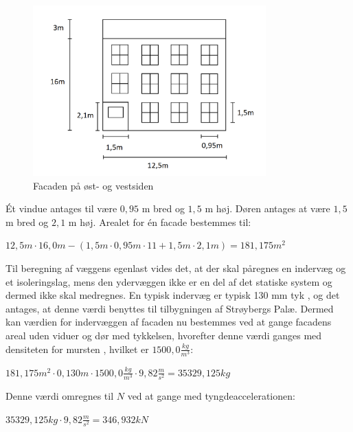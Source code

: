 \begin{figure}[htbp]
	\centering
	\includegraphics[width=0.8\textwidth]{billeder/facadenord.png}
	\caption{Facaden på øst- og vestsiden}
	\label{fig:facade}
\end{figure}

\indent{     }  Ét vindue antages til være $0,\!95$ m bred og $1,\!5$ m høj. Døren antages at være $1,\!5$ m bred og $2,\!1$ m høj. Arealet for én facade bestemmes til:
\begin{center}
	$12,\!5 m\cdot 16,\!0 m - (1,\!5 m\cdot0,\!95 m\cdot11 + 1,\!5 m\cdot 2,\!1 m)=181,\!175 m^2$
\end{center}

Til beregning af væggens egenlast vides det, at der skal påregnes en indervæg og et isoleringslag, mens den ydervæggen ikke er en del af det statiske system og dermed ikke skal medregnes.
\newline \indent{     }  En typisk indervæg er typisk 130 mm tyk \citep{indervaeg}, og det antages, at denne værdi benyttes til tilbygningen af Strøybergs Palæ. Dermed kan værdien for indervæggen af facaden nu bestemmes ved at gange facadens areal uden viduer og dør med tykkelsen, hvorefter denne værdi ganges med densiteten for mursten \citep{murstendensitet}, hvilket er $1500,\!0 \frac{kg}{m^3}$:
\begin{center}
	$181,\!175 m^2\cdot 0,\!130 m\cdot 1500,\!0 \frac{kg}{m^3}\cdot 9,\!82 \frac{m}{s^2}=35329,\!125 kg$
\end{center}

Denne værdi omregnes til $N$ ved at gange med tyngdeaccelerationen:
\begin{center}
	$35329,\!125 kg\cdot 9,\!82 \frac{m}{s^2}=346,\!932 kN$
\end{center}

